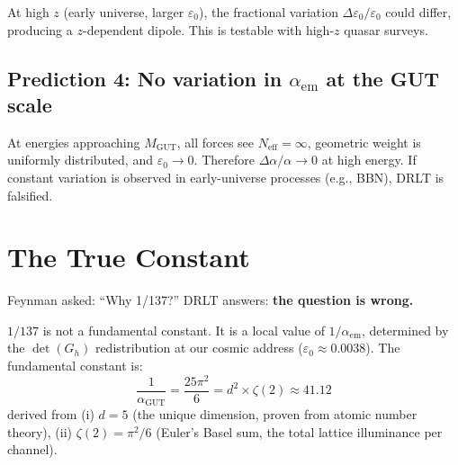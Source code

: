 \documentclass[12pt]{article}
\theoremstyle{remark}
\begin{document}
At high $z$ (early universe, larger $\varepsilon_0$), the fractional variation $\Delta\varepsilon_0/\varepsilon_0$ could differ, producing a $z$-dependent dipole. This is testable with high-$z$ quasar surveys.

\subsection{Prediction 4: No variation in $\alpha_\text{em}$ at the GUT scale}

At energies approaching $M_\text{GUT}$, all forces see $N_\text{eff} = \infty$, geometric weight is uniformly distributed, and $\varepsilon_0 \to 0$. Therefore $\Delta\alpha/\alpha \to 0$ at high energy. If constant variation is observed in early-universe processes (e.g., BBN), DRLT is falsified.

\section{The True Constant}

Feynman asked: ``Why 1/137?'' DRLT answers: \textbf{the question is wrong.}

$1/137$ is not a fundamental constant. It is a local value of $1/\alpha_\text{em}$, determined by the $\det(G_h)$ redistribution at our cosmic address ($\varepsilon_0 \approx 0.0038$). The fundamental constant is:
\begin{equation}
\boxed{\frac{1}{\alpha_\text{GUT}} = \frac{25\pi^2}{6} = d^2 \times \zeta(2) \approx 41.12}
\end{equation}
derived from (i) $d = 5$ (the unique dimension, proven from atomic number theory), (ii) $\zeta(2) = \pi^2/6$ (Euler's Basel sum, the total lattice illuminance per channel).
\end{document}
